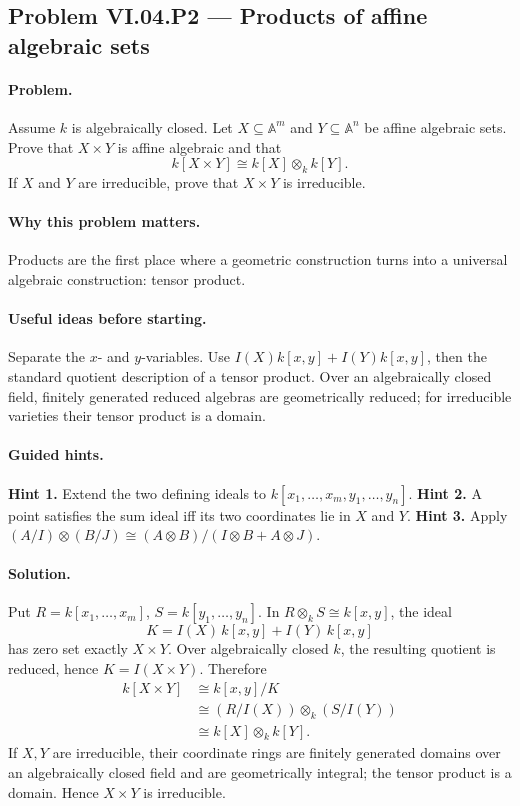 \subsection*{Problem VI.04.P2 --- Products of affine algebraic sets}
\label{prob:vi04-p2}
\paragraph{Problem.}
Assume \(k\) is algebraically closed.  Let \(X\subseteq\mathbb A^m\) and
\(Y\subseteq\mathbb A^n\) be affine algebraic sets.  Prove that \(X\times Y\) is affine
algebraic and that
\[
k[X\times Y]\cong k[X]\otimes_k k[Y].
\]
If \(X\) and \(Y\) are irreducible, prove that \(X\times Y\) is irreducible.
\ifdefined\FullProblemDossiers
\paragraph{Why this problem matters.}  Products are the first place where a geometric
construction turns into a universal algebraic construction: tensor product.
\paragraph{Useful ideas before starting.}  Separate the \(x\)- and \(y\)-variables.  Use
\(I(X)k[x,y]+I(Y)k[x,y]\), then the standard quotient description of a tensor product.
Over an algebraically closed field, finitely generated reduced algebras are geometrically
reduced; for irreducible varieties their tensor product is a domain.
\paragraph{Guided hints.}  \textbf{Hint 1.} Extend the two defining ideals to
\(k[x_1,\dots,x_m,y_1,\dots,y_n]\).  \textbf{Hint 2.} A point satisfies the sum ideal iff
its two coordinates lie in \(X\) and \(Y\).  \textbf{Hint 3.} Apply
\((A/I)\otimes(B/J)\cong(A\otimes B)/(I\otimes B+A\otimes J)\).
\paragraph{Solution.}
Put \(R=k[x_1,\dots,x_m]\), \(S=k[y_1,\dots,y_n]\).  In
\(R\otimes_kS\cong k[x,y]\), the ideal
\[
K=I(X)\,k[x,y]+I(Y)\,k[x,y]
\]
has zero set exactly \(X\times Y\).  Over algebraically closed \(k\), the resulting
quotient is reduced, hence \(K=I(X\times Y)\).  Therefore
\[
\begin{aligned}
k[X\times Y]
&\cong k[x,y]/K\\
&\cong (R/I(X))\otimes_k(S/I(Y))\\
&\cong k[X]\otimes_k k[Y].
\end{aligned}
\]
If \(X,Y\) are irreducible, their coordinate rings are finitely generated domains over an
algebraically closed field and are geometrically integral; the tensor product is a domain.
Hence \(X\times Y\) is irreducible.
